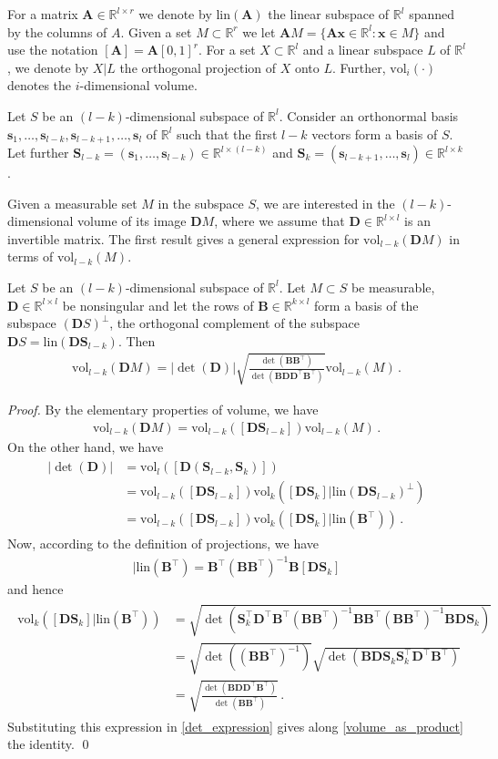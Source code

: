 \documentclass[runningheads]{llncs}
\newcommand{\ve}{\boldsymbol}
\newcommand{\be}{\begin{eqnarray}}
\newcommand{\bea}{\begin{eqnarray*}}
\newcommand{\ee}{\end{eqnarray}}
\newcommand{\eea}{\end{eqnarray*}}
\newcommand{\lin}{\mathrm{lin}}
\newcommand{\vol}{\mathrm{vol}}
\newcommand{\R}{\mathbb R}
\renewcommand\>{\rangle}
\newcommand\<{\langle}
\newcommand\0{\mathbf{0}}
\newcommand\BB{\ve B}%
\renewcommand\AA{\ve A}%
\renewcommand\SS{\ve S}
\newcommand\DD{\ve D}%
\begin{document}
For a matrix $\AA\in \R^{l\times r}$ we denote by $\lin(\AA)$ the linear subspace of $\R^l$ spanned by the columns of $A$. Given a set $M\subset \R^r$ we let $\AA M=\{\AA{\ve x}\in \R^l: {\ve x}\in M\}$ and use the notation $[\AA]=\AA[0,1]^r$. For a set $X\subset \R^l$ and a linear subspace $L$ of $\R^l$, we denote by $X|L$ the orthogonal projection of $X$ onto $L$. Further,  $\vol_i(\cdot)$  denotes the $i$-dimensional volume.

%
Let $S$ be an $(l-k)$-dimensional subspace of $\R^l$. Consider an orthonormal basis ${\ve s}_1, \ldots, {\ve s}_{l-k}, {\ve s}_{l-k+1}, \ldots, {\ve s}_l$ of $\R^l$ such that the first $l-k$ vectors form a basis of $S$. Let further $\SS_{l-k}=({\ve s}_1, \ldots, {\ve s}_{l-k})\in \R^{l\times (l-k)}$ and $\SS_{k}=({\ve s}_{l-k+1}, \ldots, {\ve s}_{l})\in \R^{l\times k}$. 

Given a measurable set  $M$ in the subspace $S$, we are interested in the $(l-k)$-dimensional volume of its image 
$\DD M$, where we assume that $\DD\in \R^{l\times l}$ is an invertible matrix. The first result gives a general expression for $\vol_{l-k}(\DD M)$ in terms of $\vol_{l-k}(M)$.

\begin{lemma} \label{section_volume_regular} Let $S$ be an $(l-k)$-dimensional subspace of $\R^l$. Let $M\subset S$ be measurable, $\DD\in \R^{l\times l}$ be nonsingular
and let the rows of $\BB\in \R^{k\times l}$ form a basis of the subspace $(\DD S)^\bot$, the orthogonal complement of the subspace $\DD S=\lin(\DD \SS_{l-k})$. Then
%
\bea
\vol_{l-k}(\DD M)= |\det(\DD)| \sqrt{\frac{\det(\BB \BB^\top)}{\det(\BB\DD\DD^\top \BB^\top)}}\vol_{l-k}(M)\,.
\eea
%
\end{lemma}

\begin{proof}

By the elementary properties of volume, we have
%
\be\label{volume_as_product}
\vol_{l-k}(\DD M)=\vol_{l-k}([\DD \SS_{l-k}])\vol_{l-k}(M)\,.
\ee
%
On the other hand, we have 
%
\be\label{det_expression}
\begin{aligned}
|\det(\DD)| & =\vol_l([\DD (\SS_{l-k}, \SS_k)])\\
& = \vol_{l-k}([\DD \SS_{l-k}])\vol_k([\DD\SS_k]| \lin(\DD\SS_{l-k})^\bot)\\
& = \vol_{l-k}([\DD \SS_{l-k}])\vol_k([\DD\SS_k]| \lin(\BB^\top))\,.
\end{aligned}
\ee
Now, according to the definition of projections, we have
\bea
[\DD\SS_k]|\lin(\BB^\top)=\BB^\top (\BB \BB^\top)^{-1}\BB[\DD\SS_k]
\eea
and hence
\bea
\begin{aligned}
\vol_k([\DD\SS_k]|\lin(\BB^\top))&=\sqrt{ \det(\SS_k^\top \DD^\top\BB^\top(\BB\BB^\top)^{-1}\BB\BB^\top(\BB\BB^\top)^{-1}\BB\DD\SS_k) }\\
&=\sqrt{\det((\BB\BB^\top)^{-1})}\sqrt{\det(\BB\DD\SS_k\SS_k^\top\DD^\top\BB^\top)}\\
&=\sqrt{\frac{\det(\BB\DD\DD^\top\BB^\top)}{\det(\BB\BB^\top)}}\,.
\end{aligned}
\eea
%
Substituting this expression in \eqref{det_expression} gives along \eqref{volume_as_product}
the identity.
\qed
\end{proof}
\end{document}
